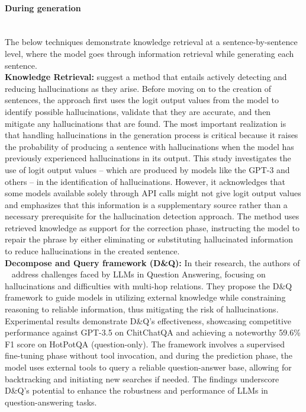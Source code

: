 \documentclass[11pt]{article}
\begin{document}
\paragraph{During generation} \mbox{} \\
\label{subsubsubsec:During generation}
The below techniques demonstrate knowledge retrieval at a sentence-by-sentence level, where the model goes through information retrieval while generating each sentence.\\ 
\textbf{Knowledge Retrieval:} \cite{varshney2023stitch} suggest a method that entails actively detecting and reducing hallucinations as they arise. Before moving on to the creation of sentences, the approach first uses the logit output values from the model to identify possible hallucinations, validate that they are accurate, and then mitigate any hallucinations that are found. The most important realization is that handling hallucinations in the generation process is critical because it raises the probability of producing a sentence with hallucinations when the model has previously experienced hallucinations in its output.
This study investigates the use of logit output values -- which are produced by models like the GPT-3 and others -- in the identification of hallucinations. However, it acknowledges that some models available solely through API calls might not give logit output values and emphasizes that this information is a supplementary source rather than a necessary prerequisite for the hallucination detection approach.
The method uses retrieved knowledge as support for the correction phase, instructing the model to repair the phrase by either eliminating or substituting hallucinated information to reduce hallucinations in the created sentence. \\
\textbf{Decompose and Query framework (D\&Q):} In their research, the authors of ~\cite{cao2023step} address challenges faced by LLMs in Question Answering, focusing on hallucinations and difficulties with multi-hop relations. They propose the D\&Q framework to guide models in utilizing external knowledge while constraining reasoning to reliable information, thus mitigating the risk of hallucinations. Experimental results demonstrate D\&Q's effectiveness, showcasing competitive performance against GPT-3.5 on ChitChatQA and achieving a noteworthy 59.6\% F1 score on HotPotQA (question-only). The framework involves a supervised fine-tuning phase without tool invocation, and during the prediction phase, the model uses external tools to query a reliable question-answer base, allowing for backtracking and initiating new searches if needed. The findings underscore D\&Q's potential to enhance the robustness and performance of LLMs in question-answering tasks. \\
\end{document}
